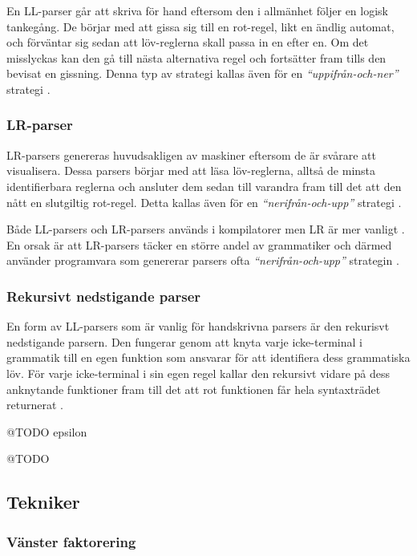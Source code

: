 En LL-parser går att skriva för hand eftersom den i allmänhet följer en logisk
tankegång. De börjar med att gissa sig till en rot-regel, likt en ändlig
automat, och förväntar sig sedan att löv-reglerna skall passa in en efter en.
Om det misslyckas kan den gå till nästa alternativa regel och fortsätter
fram tills den bevisat en gissning. Denna typ av strategi kallas även för en
\textit{``uppifrån-och-ner''} strategi \citep[s. 67]{sm09}.

\subsubsection{LR-parser}

LR-parsers genereras huvudsakligen av maskiner eftersom de är svårare att
visualisera. Dessa parsers börjar med att läsa löv-reglerna, alltså de minsta
identifierbara reglerna och ansluter dem sedan till varandra fram till det att
den nått en slutgiltig rot-regel. Detta kallas även för en
\textit{``nerifrån-och-upp''} strategi \citep[s. 67]{sm09}.

Både LL-parsers och LR-parsers används i kompilatorer men LR är mer
vanligt \citep[s. 67]{sm09}. En orsak är att LR-parsers täcker en
större andel av grammatiker och därmed använder programvara som genererar
parsers ofta \textit{``nerifrån-och-upp''} strategin \citep[s. 61]{aa06}.

\subsubsection{Rekursivt nedstigande parser}

En form av LL-parsers som är vanlig för handskrivna parsers är den rekurisvt
nedstigande parsern. Den fungerar genom att knyta varje icke-terminal i
grammatik till en egen funktion som ansvarar för att identifiera dess
grammatiska löv. För varje icke-terminal i sin egen regel kallar den rekursivt
vidare på dess anknytande funktioner fram till det att rot funktionen får hela
syntaxträdet returnerat \citep[s. 24]{pt10}.

@TODO epsilon

@TODO

\subsection{Tekniker}

\subsubsection{Vänster faktorering}

